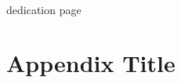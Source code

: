 \documentclass{book}
\theoremstyle{definition}\newtheorem{definition}{Definition}
\theoremstyle{definition}\newtheorem{remark}{Remark}
\theoremstyle{definition}\newtheorem{prop}{Proposition}
\theoremstyle{definition}\newtheorem{fact}{Fact}
\begin{document}
\pagestyle{empty}
\ %

\newpage
{}

\begin{titlepage}
	\vspace*{\fill}
	\begin{flushright}
		dedication page 
	\end{flushright}
	\vspace*{\fill}
\end{titlepage}



\renewcommand\thepage{\romannumeral\numexpr\value{page}-1\relax}
\setcounter{tocdepth}{1}
\tableofcontents

\cleardoublepage
{}

%
%


\appendix
\chapter{Appendix Title}



\clearpage








	
	
	
	
	
	
	
	
	
	
	
\end{document}
